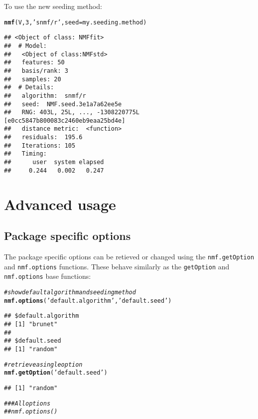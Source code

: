 \documentclass[a4paper]{article}\usepackage[]{graphicx}\usepackage[]{color}
\makeatletter
\newcommand{\hlnum}[1]{\textcolor[rgb]{0.686,0.059,0.569}{#1}}%
\newcommand{\hlstr}[1]{\textcolor[rgb]{0.192,0.494,0.8}{#1}}%
\newcommand{\hlcom}[1]{\textcolor[rgb]{0.678,0.584,0.686}{\textit{#1}}}%
\newcommand{\hlstd}[1]{\textcolor[rgb]{0.345,0.345,0.345}{#1}}%
\newcommand{\hlkwc}[1]{\textcolor[rgb]{0.333,0.667,0.333}{#1}}%
\newcommand{\hlkwd}[1]{\textcolor[rgb]{0.737,0.353,0.396}{\textbf{#1}}}%
\newenvironment{kframe}{%
 \def\at@end@of@kframe{}%
 \ifinner\ifhmode%
  \def\at@end@of@kframe{\end{minipage}}%
  \begin{minipage}{\columnwidth}%
 \fi\fi%
 \def\FrameCommand##1{\hskip\@totalleftmargin \hskip-\fboxsep
 \colorbox{shadecolor}{##1}\hskip-\fboxsep
     \hskip-\linewidth \hskip-\@totalleftmargin \hskip\columnwidth}%
 \MakeFramed {\advance\hsize-\width
   \@totalleftmargin\z@ \linewidth\hsize
   \@setminipage}}%
 {\par\unskip\endMakeFramed%
 \at@end@of@kframe}
\newenvironment{knitrout}{}{} %
\let\code=\texttt
\makeatother
\begin{document}
To use the new seeding method:
\begin{knitrout}
\color{fgcolor}\begin{kframe}
\begin{alltt}
\hlkwd{nmf}\hlstd{(V,} \hlnum{3}\hlstd{,} \hlstr{'snmf/r'}\hlstd{,} \hlkwc{seed}\hlstd{=my.seeding.method)}
\end{alltt}
\begin{verbatim}
## <Object of class: NMFfit>
##  # Model:
##   <Object of class:NMFstd>
##   features: 50 
##   basis/rank: 3 
##   samples: 20 
##  # Details:
##   algorithm:  snmf/r 
##   seed:  NMF.seed.3e1a7a62ee5e 
##   RNG: 403L, 25L, ..., -1308220775L [e0cc5847b800083c2460eb9eaa25bd4e]
##   distance metric:  <function> 
##   residuals:  195.6 
##   Iterations: 105 
##   Timing:
##      user  system elapsed 
##     0.244   0.002   0.247
\end{verbatim}
\end{kframe}
\end{knitrout}

\section{Advanced usage}

\subsection{Package specific options}
The package specific options can be retieved or changed using the \code{nmf.getOption} and \code{nmf.options} functions. 
These behave similarly as the \code{getOption} and \code{nmf.options} base functions:

\begin{knitrout}
\color{fgcolor}\begin{kframe}
\begin{alltt}
\hlcom{#show default algorithm and seeding method}
\hlkwd{nmf.options}\hlstd{(}\hlstr{'default.algorithm'}\hlstd{,} \hlstr{'default.seed'}\hlstd{)}
\end{alltt}
\begin{verbatim}
## $default.algorithm
## [1] "brunet"
## 
## $default.seed
## [1] "random"
\end{verbatim}
\begin{alltt}
\hlcom{# retrieve a single option}
\hlkwd{nmf.getOption}\hlstd{(}\hlstr{'default.seed'}\hlstd{)}
\end{alltt}
\begin{verbatim}
## [1] "random"
\end{verbatim}
\begin{alltt}
\hlcom{## # All options}
\hlcom{## nmf.options()}
\end{alltt}
\end{kframe}
\end{knitrout}
\end{document}
